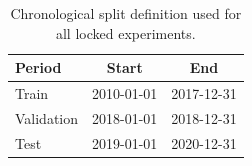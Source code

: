 \begin{table}
\centering
\caption{Chronological split definition used for all locked experiments.}
\small
\begin{tabular}{lcc}
\toprule
\textbf{Period} & \textbf{Start} & \textbf{End} \\
\midrule
Train & 2010-01-01 & 2017-12-31 \\
Validation & 2018-01-01 & 2018-12-31 \\
Test & 2019-01-01 & 2020-12-31 \\
\bottomrule
\end{tabular}
\label{tab:split}
\end{table}
